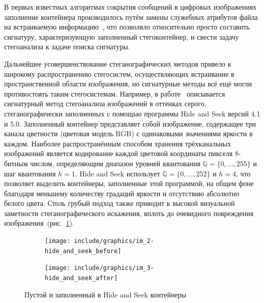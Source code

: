 В первых известных алгоритмах сокрытия сообщений в цифровых изображениях заполнение контейнера производилось путём замены служебных атрибутов файла на встраиваемую информацию~\cite{FridrichBook}, что позволяло относительно просто составить сигнатуру, характеризующую заполненный стегоконтейнер, и свести задачу стегоанализа к задаче поиска сигнатуры.

Дальнейшее усовершенствование стеганографических методов привело к широкому распространению стегосистем, осуществляющих встраивание в пространственной области изображения, но сигнатурные методы всё ещё могли противостоять таким стегосистемам. Например, в работе~\cite{HideAndSeek} описывается сигнатурный метод стегоанализа изображений в оттенках серого, стеганографически заполненных с помощью программы Hide and Seek версий 4.1 и 5.0. Заполненный контейнер представляет собой изображение, содержащее три канала цветности (цветовая модель RGB) с одинаковыми значениями яркости в каждом. Наиболее распространённым способом хранения трёхканальных изображений является кодирование каждой цветовой координаты пикселя 8-битным числом, определяющим диапазон уровней квантования $ \mathbb{Q} = \{0, \dotsc,255\} $ и шаг квантования $ h = 1 $. Hide and Seek использует $ \mathbb{Q} = \{0, \dotsc,252\} $ и $ h = 4 $, что позволяет выделить контейнеры, заполненные этой программой, на общем фоне благодаря меньшему количеству градаций яркости и отсутствию абсолютно белого цвета. Столь грубый подход также приводит к высокой визуальной заметности стеганографического искажения, вплоть до очевидного повреждения изображения~(рис.~\ref{fig:HideAndSeek}).

\begin{figure}
     \centering
     \hspace*{\fill}%
     \begin{subfigure}[b]{0.3\textwidth}
         \centering
         \texttt{[image: include/graphics/im\_2-hide\_and\_seek\_before]}
     \end{subfigure}
     \hfill
     \begin{subfigure}[b]{0.3\textwidth}
         \centering
         \texttt{[image: include/graphics/im\_3-hide\_and\_seek\_after]}
     \end{subfigure}
     \hspace*{\fill}%
     \caption{Пустой и заполненный в Hide and Seek контейнеры}
     \label{fig:HideAndSeek}
\end{figure}


